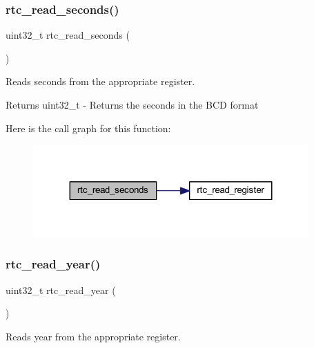 \subsubsection{\texorpdfstring{rtc\+\_\+read\+\_\+seconds()}{rtc\_read\_seconds()}}
{\footnotesize\ttfamily uint32\+\_\+t rtc\+\_\+read\+\_\+seconds (\begin{DoxyParamCaption}{ }\end{DoxyParamCaption})}



Reads seconds from the appropriate register. 

\begin{DoxyReturn}{Returns}
uint32\+\_\+t -\/ Returns the seconds in the B\+CD format 
\end{DoxyReturn}
Here is the call graph for this function\+:
\nopagebreak
\begin{figure}[H]
\begin{center}
\leavevmode
\includegraphics[width=299pt]{group__rtc_ga3d9330b99a772073f924e69bc1b2df05_cgraph}
\end{center}
\end{figure}
\mbox{\label{group__rtc_ga4ddd82a19df760d95b2dd0c92ec6c63b}} 
\subsubsection{\texorpdfstring{rtc\+\_\+read\+\_\+year()}{rtc\_read\_year()}}
{\footnotesize\ttfamily uint32\+\_\+t rtc\+\_\+read\+\_\+year (\begin{DoxyParamCaption}{ }\end{DoxyParamCaption})}



Reads year from the appropriate register. 


